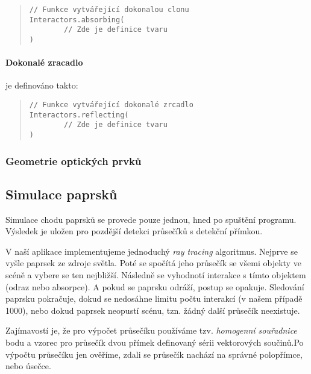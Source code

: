 \begin{minipage}{\textwidth}\begin{quote}\begin{lstlisting}
// Funkce vytvářející dokonalou clonu
Interactors.absorbing(
        // Zde je definice tvaru
)
\end{lstlisting}\end{quote}\end{minipage}
    

\paragraph{Dokonalé zracadlo} je definováno takto:

\begin{minipage}{\textwidth}\begin{quote}\begin{lstlisting}
// Funkce vytvářející dokonalé zrcadlo
Interactors.reflecting(
        // Zde je definice tvaru
)
\end{lstlisting}\end{quote}\end{minipage}


\subsubsection{Geometrie optických prvků}





\subsection{Simulace paprsků}
\label{sub:architekturaaplikace_simulacepaprsku}

Simulace chodu paprsků se provede pouze jednou, hned po spuštění programu. Výsledek je uložen pro pozdější detekci průsečíků s detekční přímkou.

V naší aplikace implementujeme jednoduchý \emph{ray tracing} algoritmus. Nejprve se vyšle paprsek ze zdroje světla. Poté se spočítá jeho průsečík se všemi objekty ve scéně a vybere se ten nejbližší. Následně se vyhodnotí interakce s tímto objektem (odraz nebo absorpce). A pokud se paprsku odráží, postup se opakuje. Sledování paprsku pokračuje, dokud se nedosáhne limitu počtu interakcí (v našem případě 1000), nebo dokud paprsek neopustí scénu, tzn. žádný další průsečík neexistuje.

Zajímavostí je, že pro výpočet průsečíku používáme tzv. \emph{homogenní souřadnice} bodu a vzorec pro průsečík dvou přímek definovaný sérii vektorových součinů.\src Po výpočtu průsečíku jen ověříme, zdali se průsečík nachází na správné polopřímce, nebo úsečce.

